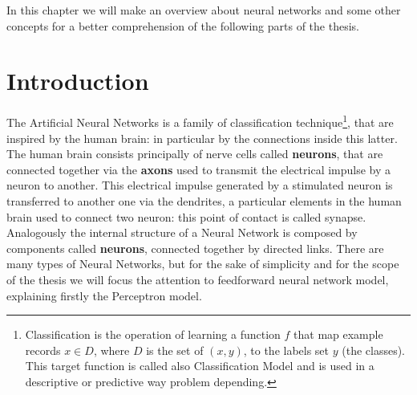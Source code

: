 \label{chap:ann}
In this chapter we will make an overview about neural networks and some other concepts for a better comprehension of the following parts of the thesis.

\section{Introduction}
The Artificial Neural Networks is a family of classification technique\footnote{Classification is the operation of learning a function \textbf{$f$} that map example records \textbf{$x \in D$}, where $D$ is the set of \textbf{$(x, y)$}, to the labels set \textbf{$y$} (the classes). This target function is called also Classification Model and is used in a descriptive or predictive way problem depending.}, that are inspired by the human brain: in particular by the connections inside this latter. The human brain consists principally of nerve cells called \textbf{neurons}, that are connected together via the \textbf{axons} used to transmit the electrical impulse by a neuron to another. This electrical impulse generated by a stimulated neuron is transferred to another one via the dendrites, a particular elements in the human brain used to connect two neuron: this point of contact is called synapse. \newline\newline
Analogously the internal structure of a Neural Network is composed by components called \textbf{neurons}, connected together by directed links. There are many types of Neural Networks, but for the sake of simplicity and  for the scope of the thesis we will focus the attention to feedforward neural network model, explaining firstly the Perceptron model.

